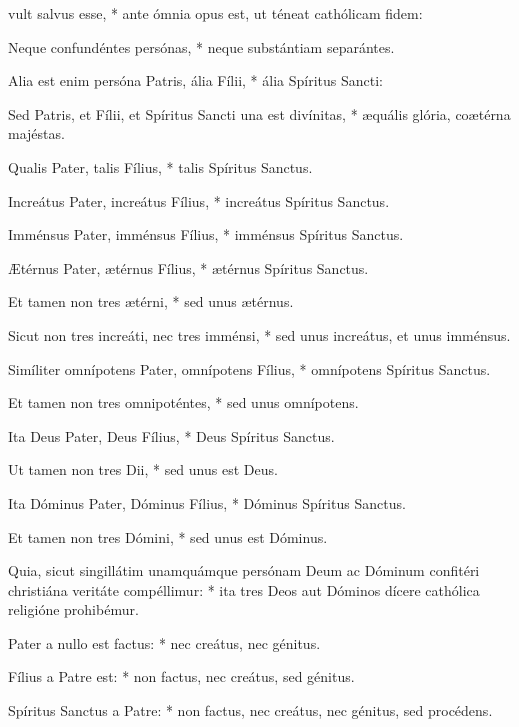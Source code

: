 { vult salvus esse, * ante ómnia opus est, ut téneat cathólicam fidem:\par
{}
Neque confundéntes persónas, * neque substántiam separántes.\par
Alia est enim persóna Patris, ália Fílii, * ália Spíritus Sancti:\par
Sed Patris, et Fílii, et Spíritus Sancti una est divínitas, * {\ae}quális glória, co{\ae}térna majéstas.\par
Qualis Pater, talis Fílius, * talis Spíritus Sanctus.\par
Increátus Pater, increátus Fílius, * increátus Spíritus Sanctus.\par
Imménsus Pater, imménsus Fílius, * imménsus Spíritus Sanctus.\par
{\AE}térnus Pater, {\ae}térnus Fílius, * {\ae}térnus Spíritus Sanctus.\par
Et tamen non tres {\ae}térni, * sed unus {\ae}térnus.\par
Sicut non tres increáti, nec tres imménsi, * sed unus increátus, et unus imménsus.\par
Simíliter omnípotens Pater, omnípotens Fílius, * omnípotens Spíritus Sanctus.\par
Et tamen non tres omnipoténtes, * sed unus omnípotens.\par
Ita Deus Pater, Deus Fílius, * Deus Spíritus Sanctus.\par
Ut tamen non tres Dii, * sed unus est Deus.\par
Ita Dóminus Pater, Dóminus Fílius, * Dóminus Spíritus Sanctus.\par
Et tamen non tres Dómini, * sed unus est Dóminus.\par
Quia, sicut singillátim unamquámque persónam Deum ac Dóminum confitéri christiána veritáte compéllimur: * ita tres Deos aut Dóminos dícere cathólica religióne prohibémur.\par
Pater a nullo est factus: * nec creátus, nec génitus.\par
Fílius a Patre est: * non factus, nec creátus, sed génitus.\par
Spíritus Sanctus a Patre: * non factus, nec creátus, nec génitus, sed procédens.\par
}
